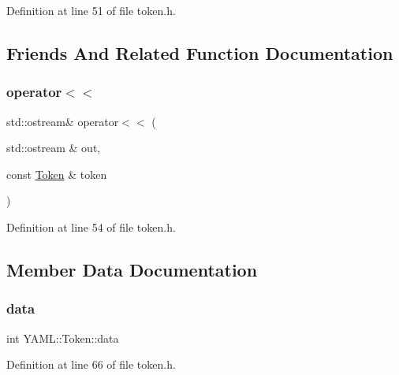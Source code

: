 Definition at line 51 of file token.\+h.



\subsection{Friends And Related Function Documentation}
\mbox{\label{struct_y_a_m_l_1_1_token_a9209854573e66d53ab24a5915e2f6638}} 
\subsubsection{\texorpdfstring{operator$<$$<$}{operator<<}}
{\footnotesize\ttfamily std\+::ostream\& operator$<$$<$ (\begin{DoxyParamCaption}\item[{std\+::ostream \&}]{out,  }\item[{const \mbox{\hyperlink{struct_y_a_m_l_1_1_token}{Token}} \&}]{token }\end{DoxyParamCaption})\hspace{0.3cm}{\ttfamily [friend]}}



Definition at line 54 of file token.\+h.



\subsection{Member Data Documentation}
\mbox{\label{struct_y_a_m_l_1_1_token_a858351d3136d14fcacd890f4974da8b2}} 
\subsubsection{\texorpdfstring{data}{data}}
{\footnotesize\ttfamily int Y\+A\+M\+L\+::\+Token\+::data}



Definition at line 66 of file token.\+h.

\mbox{\label{struct_y_a_m_l_1_1_token_aba98ab67567c733fd1f9c792d0d819d6}} 
